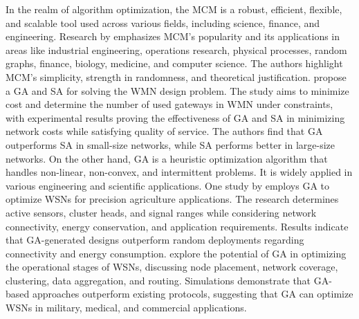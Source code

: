In the realm of algorithm optimization, the \gls{MCM} is a robust, efficient, flexible, and scalable tool used across various fields, including science, finance, and engineering. Research by \textcite{kroese2014monte} emphasizes \gls{MCM}'s popularity and its applications in areas like industrial engineering, operations research, physical processes, random graphs, finance, biology, medicine, and computer science. The authors highlight \gls{MCM}'s simplicity, strength in randomness, and theoretical justification. \textcite{girgis2014solving} propose a \gls{GA} and \gls{SA} for solving the \gls{WMN} design problem. The study aims to minimize cost and determine the number of used gateways in \gls{WMN} under constraints, with experimental results proving the effectiveness of \gls{GA} and \gls{SA} in minimizing network costs while satisfying quality of service. The authors find that GA outperforms \gls{SA} in small-size networks, while \gls{SA} performs better in large-size networks. On the other hand, \gls{GA} is a heuristic optimization algorithm that handles non-linear, non-convex, and intermittent problems. It is widely applied in various engineering and scientific applications. One study by \textcite{ferentinos2005energy} employs \gls{GA} to optimize \glspl{WSN} for precision agriculture applications. The research determines active sensors, cluster heads, and signal ranges while considering network connectivity, energy conservation, and application requirements. Results indicate that \gls{GA}-generated designs outperform random deployments regarding connectivity and energy consumption. \textcite{norouzi2014genetic} explore the potential of \gls{GA} in optimizing the operational stages of \glspl{WSN}, discussing node placement, network coverage, clustering, data aggregation, and routing. Simulations demonstrate that \gls{GA}-based approaches outperform existing protocols, suggesting that \gls{GA} can optimize \glspl{WSN} in military, medical, and commercial applications.

